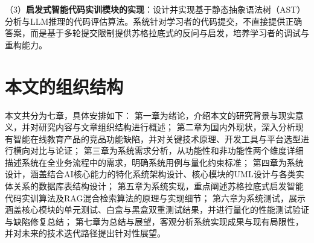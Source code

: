 （3）\textbf{启发式智能代码实训模块的实现}：设计并实现基于静态抽象语法树（AST）分析与LLM推理的代码评估算法。系统针对学习者的代码提交，不直接提供正确答案，而是基于多轮提交限制提供苏格拉底式的反问与启发，培养学习者的调试与重构能力\cite{whu-bachelor:19}。

\section{本文的组织结构}

本文共分为七章，具体安排如下：
第一章为绪论，介绍本文的研究背景与现实意义，并对研究内容与文章组织结构进行概述；
第二章为国内外现状，深入分析现有智能在线教育产品的竞品功能缺陷，并对关键技术原理、开发工具与平台选型进行横向对比与论证；
第三章为系统需求分析，从功能性和非功能性两个维度详细描述系统在全业务流程中的需求，明确系统用例与量化约束标准；
第四章为系统设计，涵盖结合AI核心能力的特化系统架构设计、核心模块的UML设计与各类实体关系的数据库表结构设计；
第五章为系统实现，重点阐述苏格拉底式启发智能代码实训算法及RAG混合检索算法的原理与实现细节；
第六章为系统测试，展示涵盖核心模块的单元测试、白盒与黑盒双重测试结果，并进行量化的性能测试验证与缺陷修复总结；
第七章为总结与展望，客观分析系统实现成果与现有局限性，并对未来的技术迭代路径提出针对性展望。
